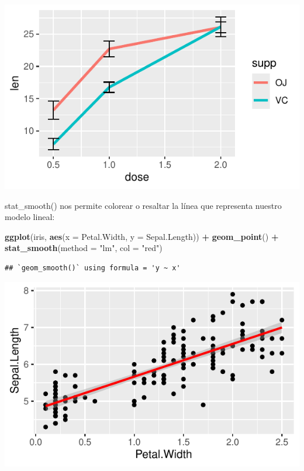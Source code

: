 \documentclass[
]{book}
\newenvironment{Shaded}{\begin{snugshade}}{\end{snugshade}}
\newcommand{\AttributeTok}[1]{\textcolor[rgb]{0.13,0.29,0.53}{#1}}
\newcommand{\FunctionTok}[1]{\textcolor[rgb]{0.13,0.29,0.53}{\textbf{#1}}}
\newcommand{\NormalTok}[1]{#1}
\newcommand{\SpecialCharTok}[1]{\textcolor[rgb]{0.81,0.36,0.00}{\textbf{#1}}}
\newcommand{\StringTok}[1]{\textcolor[rgb]{0.31,0.60,0.02}{#1}}
\begin{document}
\begin{center}\includegraphics{_main_files/figure-latex/unnamed-chunk-224-1} \end{center}

stat\_smooth() nos permite colorear o resaltar la línea que representa nuestro modelo lineal:

\begin{Shaded}
\begin{Highlighting}[]
\FunctionTok{ggplot}\NormalTok{(iris, }\FunctionTok{aes}\NormalTok{(}\AttributeTok{x =}\NormalTok{ Petal.Width, }\AttributeTok{y =}\NormalTok{ Sepal.Length)) }\SpecialCharTok{+} 
  \FunctionTok{geom\_point}\NormalTok{() }\SpecialCharTok{+}
  \FunctionTok{stat\_smooth}\NormalTok{(}\AttributeTok{method =} \StringTok{"lm"}\NormalTok{, }\AttributeTok{col =} \StringTok{"red"}\NormalTok{)}
\end{Highlighting}
\end{Shaded}

\begin{verbatim}
## `geom_smooth()` using formula = 'y ~ x'
\end{verbatim}

\begin{center}\includegraphics{_main_files/figure-latex/unnamed-chunk-225-1} \end{center}
\end{document}
